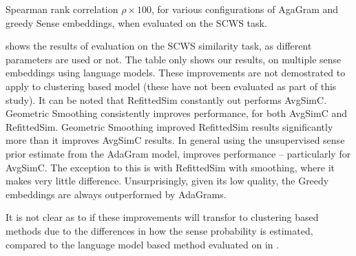 \documentclass{sig-alternate}
\begin{document}
\begin{table}
	\begin{adjustbox}{max width=\columnwidth}
	\end{adjustbox}
\caption{Spearman rank correlation $\rho \times 100$, for various configurations of AgaGram and greedy Sense embeddings, when evaluated on the SCWS task.} \label{swscres}
\end{table}

 shows the results of evaluation on the SCWS similarity task, as different parameters are used or not. The table only shows our results, on multiple sense embeddings using language models. These improvements are not demostrated to apply to clustering based model (these have not been evaluated as part of this study).
It can be noted that RefittedSim constantly out performs AvgSimC.
Geometric Smoothing consistently improves performance, for both AvgSimC and RefittedSim. Geometric Smoothing improved RefittedSim results significantly more than it improves AvgSimC results.
In general using the unsupervised sense prior estimate from the AdaGram model, improves performance -- particularly for AvgSimC. The exception to this is with RefittedSim with smoothing, where it makes very little difference. 
Unsurprisingly, given its low quality, the Greedy embeddings are always outperformed by AdaGrams.

It is not clear as to if these improvements will transfor to clustering based methods due to the differences in how the sense probability is estimated, compared to the language model based method evaluated on in .
\end{document}
